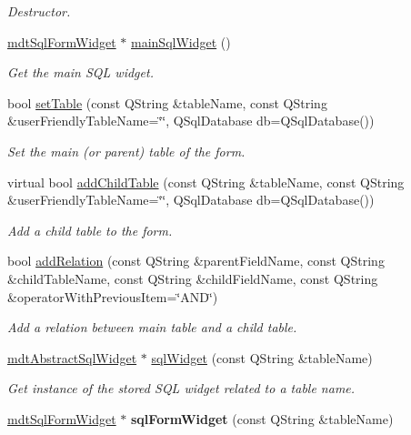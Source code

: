 \begin{DoxyCompactItemize}
\begin{DoxyCompactList}\small\item\em Destructor. \end{DoxyCompactList}\item 
\hyperlink{classmdt_sql_form_widget}{mdtSqlFormWidget} $\ast$ \hyperlink{classmdt_sql_form_a857fc9370e2054408ae8b42e8deedbf5}{mainSqlWidget} ()
\begin{DoxyCompactList}\small\item\em Get the main SQL widget. \end{DoxyCompactList}\item 
bool \hyperlink{classmdt_sql_form_a8a3c5c3fa87da8a1b45c287e08f069c1}{setTable} (const QString \&tableName, const QString \&userFriendlyTableName=\char`\"{}\char`\"{}, QSqlDatabase db=QSqlDatabase())
\begin{DoxyCompactList}\small\item\em Set the main (or parent) table of the form. \end{DoxyCompactList}\item 
virtual bool \hyperlink{classmdt_sql_form_a75710fca8759142a5cebb53fa4184906}{addChildTable} (const QString \&tableName, const QString \&userFriendlyTableName=\char`\"{}\char`\"{}, QSqlDatabase db=QSqlDatabase())
\begin{DoxyCompactList}\small\item\em Add a child table to the form. \end{DoxyCompactList}\item 
bool \hyperlink{classmdt_sql_form_ab9bb1b548b71ef4e8547846b6aedec66}{addRelation} (const QString \&parentFieldName, const QString \&childTableName, const QString \&childFieldName, const QString \&operatorWithPreviousItem=\char`\"{}AND\char`\"{})
\begin{DoxyCompactList}\small\item\em Add a relation between main table and a child table. \end{DoxyCompactList}\item 
\hyperlink{classmdt_abstract_sql_widget}{mdtAbstractSqlWidget} $\ast$ \hyperlink{classmdt_sql_form_a345555605914bf8198d093abdd3cda1e}{sqlWidget} (const QString \&tableName)
\begin{DoxyCompactList}\small\item\em Get instance of the stored SQL widget related to a table name. \end{DoxyCompactList}\item 
\hypertarget{classmdt_sql_form_a59dc3afec69c8b6a18ed7fccb42c70ad}{
\hyperlink{classmdt_sql_form_widget}{mdtSqlFormWidget} $\ast$ {\bfseries sqlFormWidget} (const QString \&tableName)}
\label{classmdt_sql_form_a59dc3afec69c8b6a18ed7fccb42c70ad}


\end{DoxyCompactItemize}
